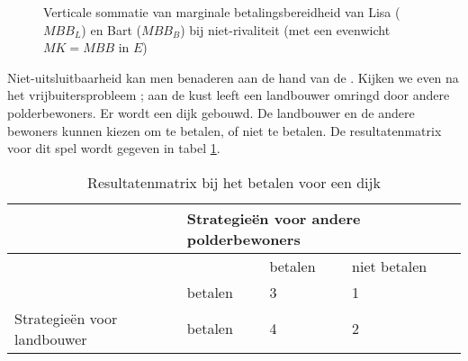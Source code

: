 \begin{figure}[H]
\centering
\captionsetup{justification=centering,margin=2cm}
\caption{Verticale sommatie van marginale betalingsbereidheid van Lisa ($MBB_L$) en Bart ($MBB_B$) bij niet-rivaliteit (met een evenwicht $MK=MBB$ in $E$)}
\label{fig:h4-nrivmbb}
\end{figure}

Niet-uitsluitbaarheid kan men benaderen aan de hand van de . Kijken we even na het vrijbuitersprobleem ; aan de kust leeft een landbouwer omringd door andere polderbewoners. Er wordt een dijk gebouwd. De landbouwer en de andere bewoners kunnen kiezen om te betalen, of niet te betalen. De resultatenmatrix voor dit spel wordt gegeven in tabel \ref{tab:h4-vrijbuiter}.

\begin{table}[H]
\centering
\begin{tabular}{l|lll}
\cline{2-4}
 & \multicolumn{3}{l|}{\cellcolor[HTML]{EFEFEF}Strategie\"en voor andere polderbewoners} \\ \hline
\multicolumn{1}{|l|}{\cellcolor[HTML]{EFEFEF}} &  & betalen & niet betalen \\
\multicolumn{1}{|l|}{\cellcolor[HTML]{EFEFEF}} & betalen & 3 & 1 \\
\multicolumn{1}{|l|}{\multirow{-3}{*}{\cellcolor[HTML]{EFEFEF}Strategie\"en voor landbouwer}} & betalen & 4 & 2 \\ \cline{1-1}
\end{tabular}
\caption{Resultatenmatrix bij het betalen voor een dijk}
\label{tab:h4-vrijbuiter}
\end{table}

